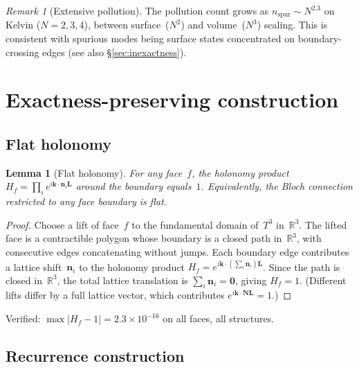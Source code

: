 \documentclass[12pt]{article}
\newtheorem{lemma}[theorem]{Lemma}
\theoremstyle{definition}
\theoremstyle{remark}
\newtheorem{remark}[theorem]{Remark}
\newcommand{\RR}{\mathbb{R}}
\newcommand{\kk}{\mathbf{k}}
\newcommand{\LL}{\mathbf{L}}
\newcommand{\nn}{\mathbf{n}}
\begin{document}
\begin{remark}[Extensive pollution]\label{rem:extensive}
The pollution count grows as $n_{\mathrm{spur}} \sim N^{2.3}$ on Kelvin
($N = 2, 3, 4$), between surface~($N^2$) and volume~($N^3$) scaling. This is
consistent with spurious modes being surface states concentrated on
boundary-crossing edges (see also \S\ref{sec:inexactness}).
\end{remark}

\section{Exactness-preserving construction}
\label{sec:construction}

\subsection{Flat holonomy}

\begin{lemma}[Flat holonomy]\label{lem:holonomy}
For any face~$f$, the holonomy product
$H_f = \prod_i e^{i\kk\cdot\nn_i\LL}$ around the boundary equals~$1$.
Equivalently, the Bloch connection restricted to any face boundary is flat.
\end{lemma}

\begin{proof}
Choose a lift of face~$f$ to the fundamental domain of~$T^3$ in~$\RR^3$.
The lifted face is a contractible polygon whose boundary is a closed path
in~$\RR^3$, with consecutive edges concatenating without jumps. Each boundary
edge contributes a lattice shift~$\nn_i$ to the holonomy product
$H_f = e^{i\kk\cdot(\sum_i \nn_i)\LL}$. Since the path is closed in~$\RR^3$,
the total lattice translation is $\sum_i \nn_i = \mathbf{0}$, giving
$H_f = 1$. (Different lifts differ by a full lattice vector, which contributes
$e^{i\kk\cdot\mathbf{N}\LL} = 1$.)
\end{proof}

Verified: $\max|H_f - 1| = 2.3 \times 10^{-16}$ on all faces, all structures.

\subsection{Recurrence construction}
\end{document}

